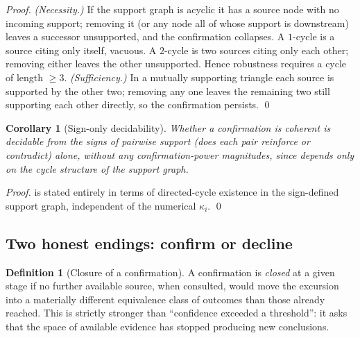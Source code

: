 \documentclass[11pt,a4paper,twocolumn]{article}
\theoremstyle{thmstyle}
\newtheorem{corollary}[theorem]{Corollary}
\theoremstyle{definition}
\newtheorem{definition}[theorem]{Definition}
\theoremstyle{remark}
\begin{document}
\begin{proof}
\emph{(Necessity.)} If the support graph is acyclic it has a source node
with no incoming support; removing it (or any node all of whose support
is downstream) leaves a successor unsupported, and the confirmation
collapses. A $1$-cycle is a source citing only itself, vacuous. A
$2$-cycle is two sources citing only each other; removing either leaves
the other unsupported. Hence robustness requires a cycle of length
$\ge3$. \emph{(Sufficiency.)} In a mutually supporting triangle each
source is supported by the other two; removing any one leaves the
remaining two still supporting each other directly, so the confirmation
persists. \qed
\end{proof}

\begin{corollary}[Sign-only decidability]
\label{cor:signonly}
Whether a confirmation is coherent is decidable from the \emph{signs} of
pairwise support (does each pair reinforce or contradict) alone, without
any confirmation-power magnitudes, since  depends only
on the cycle structure of the support graph.
\end{corollary}

\begin{proof}
 is stated entirely in terms of directed-cycle
existence in the sign-defined support graph, independent of the numerical
$\kappa_i$. \qed
\end{proof}

\subsection{Two honest endings: confirm or decline}

\begin{definition}[Closure of a confirmation]
\label{def:closure}
A confirmation is \emph{closed} at a given stage if no further available
source, when consulted, would move the excursion into a materially
different equivalence class of outcomes than those already reached. This
is strictly stronger than ``confidence exceeded a threshold'': it asks
that the space of available evidence has stopped producing new
conclusions.
\end{definition}
\end{document}
